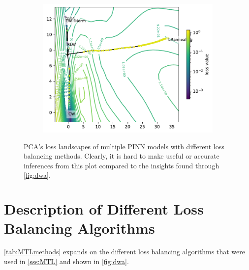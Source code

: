 \documentclass[letterpaper]{article} %
\begin{document}
\begin{figure}[htb]
\begin{subfigure}[b]{0.3\textwidth}
              \end{subfigure}
                \begin{subfigure}[b]{0.3\textwidth}
                \includegraphics[width=\textwidth]{figures/round3/MTL_PCA/directions.h5_proj_cos_test_mse_Convection.h5_Convection_test_mse_loss_2dcontour_proj.pdf}
              \end{subfigure}


              \caption{PCA's loss landscapes of multiple PINN models with different loss balancing methods. Clearly, it is hard to make useful or accurate inferences from this plot compared to the insights found through \cref{fig:dwa}. }
              \label{fig:dwaPCA}
            \end{figure}

    \section{Description of Different Loss Balancing Algorithms} \label{app:lossbalancing}

    \cref{tab:MTLmethods} expands on the different loss balancing algorithms that were used in \cref{sss:MTL} and shown in \cref{fig:dwa}.
    
\end{document}
